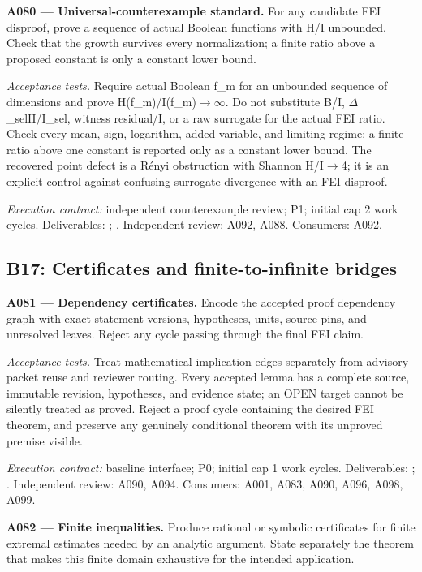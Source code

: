 \documentclass[11pt]{article}
\begin{document}
\textbf{A080 --- Universal-counterexample standard.} For any candidate FEI disproof, prove a sequence of actual Boolean functions with H/I unbounded. Check that the growth survives every normalization; a finite ratio above a proposed constant is only a constant lower bound.

\emph{Acceptance tests.} Require actual Boolean f\_m for an unbounded sequence of dimensions and prove H(f\_m)/I(f\_m)$\to$$\infty$. Do not substitute B/I, $\Delta$\_selH/I\_sel, witness residual/I, or a raw surrogate for the actual FEI ratio. Check every mean, sign, logarithm, added variable, and limiting regime; a finite ratio above one constant is reported only as a constant lower bound. The recovered point defect is a R\'{e}nyi obstruction with Shannon H/I$\to$4; it is an explicit control against confusing surrogate divergence with an FEI disproof.

{\small\emph{Execution contract:} independent counterexample review; P1; initial cap 2 work cycles. Deliverables: ; . Independent review: A092, A088. Consumers: A092.}

\subsection{B17: Certificates and finite-to-infinite bridges}

\textbf{A081 --- Dependency certificates.} Encode the accepted proof dependency graph with exact statement versions, hypotheses, units, source pins, and unresolved leaves. Reject any cycle passing through the final FEI claim.

\emph{Acceptance tests.} Treat mathematical implication edges separately from advisory packet reuse and reviewer routing. Every accepted lemma has a complete source, immutable revision, hypotheses, and evidence state; an OPEN target cannot be silently treated as proved. Reject a proof cycle containing the desired FEI theorem, and preserve any genuinely conditional theorem with its unproved premise visible.

{\small\emph{Execution contract:} baseline interface; P0; initial cap 1 work cycles. Deliverables: ; . Independent review: A090, A094. Consumers: A001, A083, A090, A096, A098, A099.}

\textbf{A082 --- Finite inequalities.} Produce rational or symbolic certificates for finite extremal estimates needed by an analytic argument. State separately the theorem that makes this finite domain exhaustive for the intended application.
\end{document}
